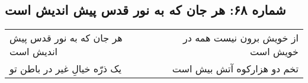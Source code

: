 \begin{center}
\section*{شماره ۶۸: هر جان که به نور قدس پیش اندیش است}
\label{sec:068}
\begin{longtable}{l p{0.5cm} r}
هر جان که به نور قدس پیش اندیش است
&&
از خویش برون نیست همه در خویش است
\\
یک ذرّه خیالِ غیر در باطن تو
&&
تخم دو هزارکوه آتش بیش است
\\
\end{longtable}
\end{center}
